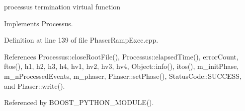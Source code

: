 processus termination virtual function 

Implements \hyperlink{classProcessus_aba93d691f031bdb18ae4b8afb1b2e856}{Processus}.



Definition at line 139 of file Phaser\+Ramp\+Exec.\+cpp.



References Processus\+::close\+Root\+File(), Processus\+::elapsed\+Time(), error\+Count, ftos(), h1, h2, h3, h4, hv1, hv2, hv3, hv4, Object\+::info(), itos(), m\+\_\+init\+Phase, m\+\_\+n\+Processed\+Events, m\+\_\+phaser, Phaser\+::set\+Phase(), Status\+Code\+::\+S\+U\+C\+C\+E\+SS, and Phaser\+::write().



Referenced by B\+O\+O\+S\+T\+\_\+\+P\+Y\+T\+H\+O\+N\+\_\+\+M\+O\+D\+U\+L\+E().


